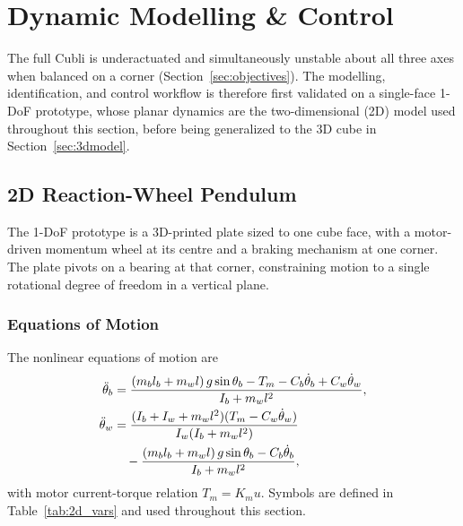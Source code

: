 \section{Dynamic Modelling \& Control}
\label{sec:modelling}


The full Cubli is underactuated and simultaneously unstable about all three
axes when balanced on a corner (Section~\ref{sec:objectives}). The modelling,
identification, and control workflow is therefore first validated on a
single-face 1-DoF prototype, whose planar dynamics are the two-dimensional (2D)
model used throughout this section, before being generalized to the 3D cube in
Section~\ref{sec:3dmodel}.

\subsection{2D Reaction-Wheel Pendulum}
\label{sec:2dmodel}

The 1-DoF prototype is a 3D-printed plate sized to one cube face, with a
motor-driven momentum wheel at its centre and a braking mechanism at one
corner. The plate pivots on a bearing at that corner, constraining motion to a
single rotational degree of freedom in a vertical plane.


\subsubsection{Equations of Motion}
\label{sec:2deom}

The nonlinear equations of motion are
\begin{align}
\ddot{\theta}_b &= \frac{(m_b l_b + m_w l)\, g \sin\theta_b - T_m - C_b \dot{\theta}_b + C_w \dot{\theta}_w}{I_b + m_w l^2}, \\
\ddot{\theta}_w &= \frac{(I_b + I_w + m_w l^2)(T_m - C_w \dot{\theta}_w)}{I_w (I_b + m_w l^2)} \notag \\
&\quad - \frac{(m_b l_b + m_w l)\, g \sin\theta_b - C_b \dot{\theta}_b}{I_b + m_w l^2},
\end{align}
with motor current-torque relation $T_m = K_m u$. Symbols are defined in
Table~\ref{tab:2d_vars} and used throughout this section.

